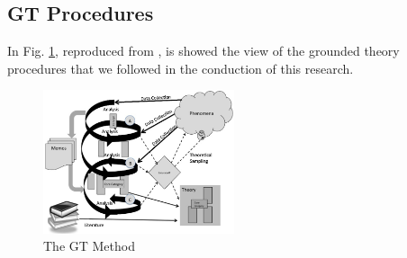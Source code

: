\subsection{GT Procedures}

In Fig. \ref{fig1}, reproduced from \cite{adolph2011using}, is showed the view
of the grounded theory procedures that we followed in the conduction of this
research.

\begin{figure}[htpb]
  \centering
  \includegraphics[width=0.5\textwidth,natwidth=821,natheight=617]{GT.png}
  \caption{The GT Method \cite{adolph2011using}}
  \label{fig1}
\end{figure}

